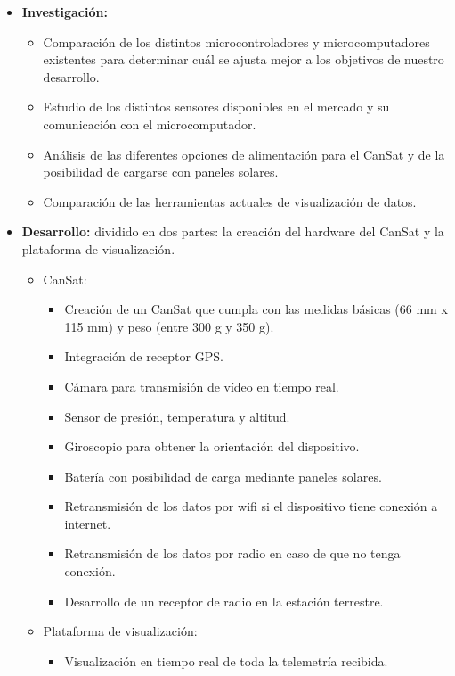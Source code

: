 \begin{itemize}
    \item \textbf{Investigación:}
    \begin{itemize}
        \item Comparación de los distintos microcontroladores y microcomputadores existentes para determinar cuál se ajusta mejor a los objetivos de nuestro desarrollo.
        \item Estudio de los distintos sensores disponibles en el mercado y su comunicación con el microcomputador.
        \item Análisis de las diferentes opciones de alimentación para el CanSat y de la posibilidad de cargarse con paneles solares.
        \item Comparación de las herramientas actuales de visualización de datos.
    \end{itemize}
    \item \textbf{Desarrollo:} dividido en dos partes: la creación del hardware del CanSat y la plataforma de visualización.
    \begin{itemize}
        \item CanSat:
        \begin{itemize}
            \item Creación de un CanSat que cumpla con las medidas básicas (66 mm x 115 mm) y peso (entre 300 g y 350 g).
            \item Integración de receptor GPS.
            \item Cámara para transmisión de vídeo en tiempo real.
            \item Sensor de presión, temperatura y altitud.
            \item Giroscopio para obtener la orientación del dispositivo.
            \item Batería con posibilidad de carga mediante paneles solares.
            \item Retransmisión de los datos por wifi si el dispositivo tiene conexión a internet.
            \item Retransmisión de los datos por radio en caso de que no tenga conexión.
            \item Desarrollo de un receptor de radio en la estación terrestre.
        \end{itemize}
        \item Plataforma de visualización:
        \begin{itemize}
            \item Visualización en tiempo real de toda la telemetría recibida.

\end{itemize}
\end{itemize}
\end{itemize}
